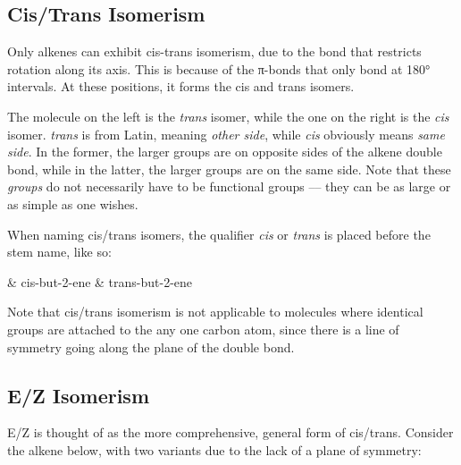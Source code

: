 		\pagebreak
		\subsection{Cis/Trans Isomerism}

			Only alkenes can exhibit cis-trans isomerism, due to the  bond that restricts rotation along its axis. This is because
			of the π-bonds that only bond at 180° intervals. At these positions, it forms the cis and trans isomers.


			The molecule on the left is the \textit{trans} isomer, while the one on the right is the \textit{cis} isomer. \textit{trans}
			is from Latin, meaning \textit{other side}, while \textit{cis} obviously means \textit{same side}. In the former,
			the larger groups are on opposite sides of the alkene double bond, while in the latter, the larger groups are on the same
			side. Note that these \textit{groups} do not necessarily have to be functional groups –– they can be as large or as simple
			as one wishes.

			When naming cis/trans isomers, the qualifier \textit{cis} or \textit{trans} is placed before the stem name, like so:
			\begin{bulletlist}
				& cis-but-2-ene
				& trans-but-2-ene
			\end{bulletlist}

			Note that cis/trans isomerism is not applicable to molecules where identical groups are attached to the any one carbon atom,
			since there is a line of symmetry going along the plane of the double bond.






		\pagebreak
		\subsection{E/Z Isomerism}

			E/Z is thought of as the more comprehensive, general form of cis/trans. Consider the alkene below, with two variants
			due to the lack of a plane of symmetry:

